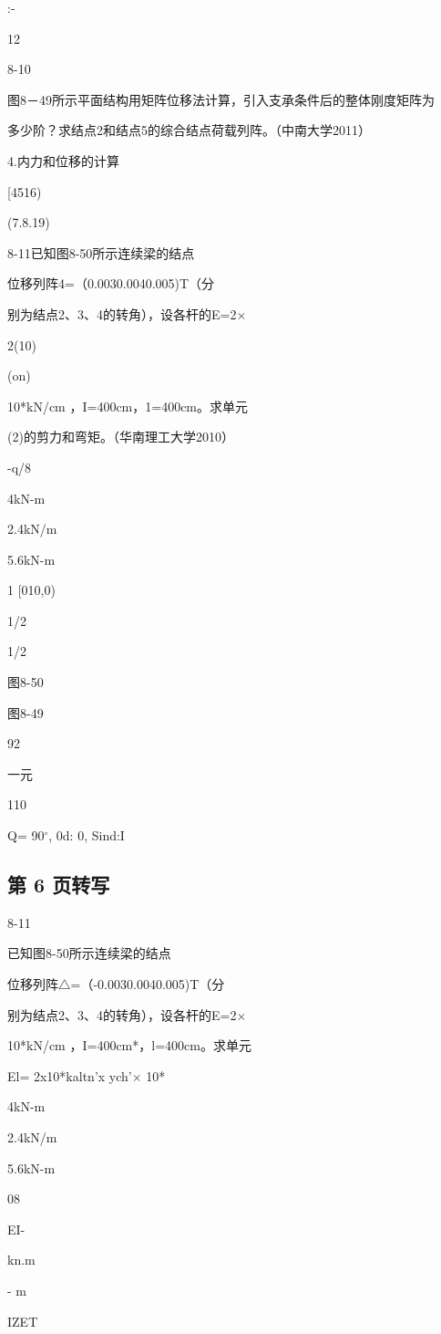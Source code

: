 :-

12

8-10

图8－49所示平面结构用矩阵位移法计算，引入支承条件后的整体刚度矩阵为

多少阶？求结点2和结点5的综合结点荷载列阵。（中南大学2011）

4.内力和位移的计算

[4516)

(7.8.19)

8-11已知图8-50所示连续梁的结点

位移列阵4=（0.0030.0040.005)T（分

别为结点2、3、4的转角），设各杆的E=2$\times$

2(10)

(on)

10*kN/cm ，I=400cm，1=400cm。求单元

(2)的剪力和弯矩。（华南理工大学2010）

-q/8

4kN-m

2.4kN/m

5.6kN-m

1 [010,0)

1/2

1/2

图8-50

图8-49

92

一元

110

Q= 90$^\circ$, 0d: 0, Sind:I

\subsection*{第 6 页转写}
8-11

已知图8-50所示连续梁的结点

位移列阵$\triangle$=（-0.0030.0040.005)T（分

别为结点2、3、4的转角），设各杆的E=2$\times$

10*kN/cm ，I=400cm*，l=400cm。求单元

El= 2x10*kaltn'x ych'$\times$ 10*

4kN-m

2.4kN/m

5.6kN-m

08

EI-

kn.m

- m

IZET

